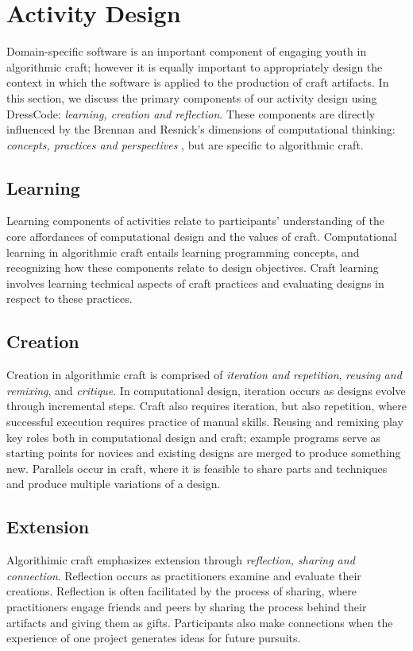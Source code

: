 \documentclass{sigchi}
\begin{document}
\section{Activity Design}
Domain-specific software is an important component of engaging youth in algorithmic craft; however it is equally important to appropriately design the context in which the software is applied to the production of craft artifacts. In this section, we discuss the primary components of our activity design using DressCode: \emph{learning, creation and reflection}. These components are directly influenced by the Brennan and Resnick's dimensions of computational thinking: \emph{concepts, practices and perspectives} \cite{computational_thinking}, but are specific to algorithmic craft.

\subsection{Learning}
Learning components of activities relate to participants' understanding of the core affordances of computational design and the values of craft. Computational learning in algorithmic craft entails learning programming concepts, and recognizing how these components relate to design objectives. Craft learning involves learning technical aspects of craft practices and evaluating designs in respect to these practices.

\subsection{Creation}
Creation in algorithmic craft is comprised of \emph{iteration and repetition}, \emph{reusing and remixing}, and \emph{critique}. In computational design, iteration occurs as designs evolve through incremental steps. Craft also requires iteration, but also repetition, where successful execution requires practice of manual skills. Reusing and remixing play key roles both in computational design and craft; example programs serve as starting points for novices and existing designs are merged to produce something new. Parallels occur in craft, where it is feasible to share parts and techniques and produce multiple variations of a design.

\subsection{Extension}
Algorithimic craft emphasizes extension through \emph{reflection, sharing and connection}. Reflection occurs as practitioners examine and evaluate their creations.  Reflection is often facilitated by the process of sharing, where practitioners engage friends and peers by sharing the process behind their artifacts and giving them as gifts. Participants also make connections when the experience of one project generates ideas for future pursuits.
\end{document}
